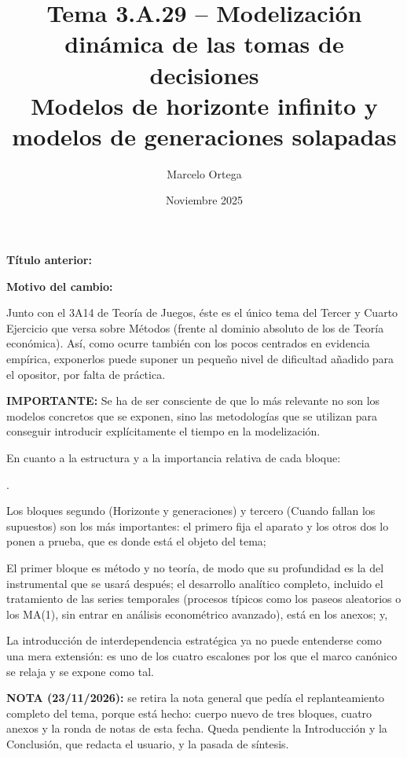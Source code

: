\documentclass[10pt,a4paper]{article}
\title{Tema 3.A.29 -- Modelización dinámica de las tomas de decisiones\\
\large Modelos de horizonte infinito y modelos de generaciones solapadas}
\author{Marcelo Ortega}
\date{Noviembre 2025}
\newcounter{numitem}
\newcommand{\puntosclave}[1]{%
  \begin{tcolorbox}[
    colframe=black,
    title={Puntos clave},
    before upper={\setlength{\parindent}{0.5cm}\setlength{\parskip}{0.5\baselineskip}}
  ]
  #1
  \end{tcolorbox}
}
\newcommand{\modificaciones}[1]{
  \begin{tcolorbox}[
    colback=white,
    colframe=red,
    title={Modificaciones a realizar},
    before upper={\setlength{\parindent}{0.5cm}\setlength{\parskip}{0.5\baselineskip}}
  ]
  #1
  \end{tcolorbox}
}
\newenvironment{lnum}
      {\begin{list}{\arabic{numitem}.}{%
          \usecounter{numitem}%
          \setlength{\leftmargin}{1cm}%
          \setlength{\parskip}{3pt}%
          \setlength{\itemsep}{0pt}%
          \setlength{\parsep}{0pt}%
      }}
      {\end{list}}
\newcommand{\changebox}{%
\begin{tcolorbox}[title={Historial de cambios del tema}]
\textbf{Título anterior:} \OldTitle\par
\textbf{Motivo del cambio:} \ChangeWhy
\end{tcolorbox}
}
\newcounter{anexo}
\begin{document}
\maketitle
\changebox

\newpage

\puntosclave{ %
    Junto con el 3A14 de Teoría de Juegos, éste es el único tema del Tercer y Cuarto Ejercicio que versa sobre Métodos (frente al dominio absoluto de los de Teoría económica). Así, como ocurre también con los pocos centrados en evidencia empírica, exponerlos puede suponer un pequeño nivel de dificultad añadido para el opositor, por falta de práctica. 
    
    \textbf{IMPORTANTE:} Se ha de ser consciente de que lo más relevante no son los modelos concretos que se exponen, sino las metodologías que se utilizan para conseguir introducir explícitamente el tiempo en la modelización.

    En cuanto a la estructura y a la importancia relativa de cada bloque:
    \begin{lnum}
        \item Los bloques segundo (Horizonte y generaciones) y tercero (Cuando fallan los supuestos) son los más importantes: el primero fija el aparato y los otros dos lo ponen a prueba, que es donde está el objeto del tema;
        \item El primer bloque es método y no teoría, de modo que su profundidad es la del instrumental que se usará después; el desarrollo analítico completo, incluido el tratamiento de las series temporales (procesos típicos como los paseos aleatorios o los MA(1), sin entrar en análisis econométrico avanzado), está en los anexos; y,
        \item La introducción de interdependencia estratégica ya no puede entenderse como una mera extensión: es uno de los cuatro escalones por los que el marco canónico se relaja y se expone como tal.
    \end{lnum}
    }
\vspace{1cm}

\modificaciones{
    \textbf{NOTA (23/11/2026):} se retira la nota general que pedía el replanteamiento completo del tema, porque está hecho: cuerpo nuevo de tres bloques, cuatro anexos y la ronda de notas de esta fecha. Queda pendiente la Introducción y la Conclusión, que redacta el usuario, y la pasada de síntesis.

    
    


 

    }
\end{document}
